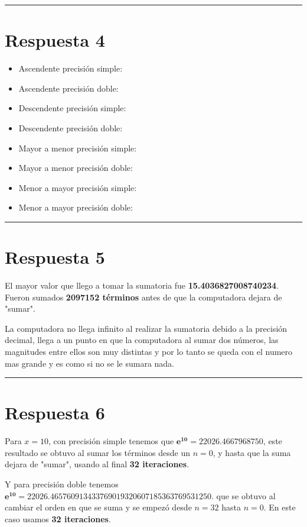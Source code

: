 \documentclass{article}
\begin{document}


\hrule
\section*{Respuesta 4}
\begin{itemize}
	\item Ascendente precisión simple:
	\item Ascendente precisión doble:
	\item Descendente precisión simple:
	\item Descendente precisión doble:
	\item Mayor a menor precisión simple:
	\item Mayor a menor precisión doble:
	\item Menor a mayor precisión simple:
	\item Menor a mayor precisión doble:
\end{itemize}


\hrule
\section*{Respuesta 5}
El mayor valor que llego a tomar la sumatoria fue \textbf{15.4036827008740234}.
Fueron sumados \textbf{2097152 términos} antes de que la computadora dejara de "sumar".

La computadora no llega infinito al realizar la sumatoria debido
a la precisión decimal, llega a un punto en que la computadora al sumar dos números, las magnitudes entre ellos
son muy distintas y por lo tanto se queda con el numero mas grande y es como si no se le sumara nada.
\vspace{0.3cm}


\hrule
\section*{Respuesta 6}
Para $x = 10$, con precisión simple tenemos que $\boldsymbol{e^{10} = 22026.4667968750}$,
este resultado se obtuvo al sumar los términos desde un $n = 0$, y hasta que la suma dejara de "sumar",
usando al final \textbf{32 iteraciones}.

Y para precisión doble tenemos $\boldsymbol{e^{10} = 22026.465760913433769019320607185363769531250}$.
que se obtuvo al cambiar el orden en que se suma y se empezó desde $n = 32$ hasta $n = 0$. 
En este caso usamos \textbf{32 iteraciones}.
\end{document}
